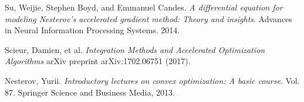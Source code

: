 \begin{thebibliography}{9}
 Su, Weijie, Stephen Boyd, and Emmanuel Candes. \textit{A differential equation for modeling Nesterov’s accelerated gradient method: Theory and insights}. Advances in Neural Information Processing Systems. 2014.

Scieur, Damien, et al. \textit{Integration Methods and Accelerated Optimization Algorithms} arXiv preprint arXiv:1702.06751 (2017).

Nesterov, Yurii. \textit{Introductory lectures on convex optimization: A basic course}. Vol. 87. Springer Science and Business Media, 2013.



\end{thebibliography}
